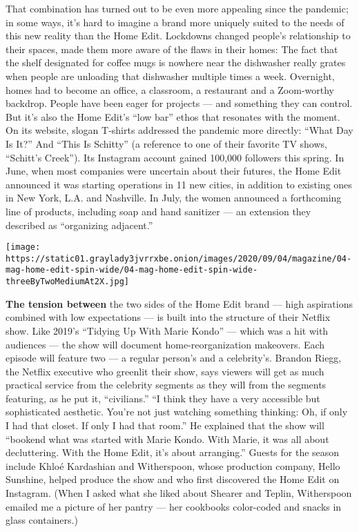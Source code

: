 That combination has turned out to be even more appealing since the
pandemic; in some ways, it's hard to imagine a brand more uniquely
suited to the needs of this new reality than the Home Edit. Lockdowns
changed people's relationship to their spaces, made them more aware of
the flaws in their homes: The fact that the shelf designated for coffee
mugs is nowhere near the dishwasher really grates when people are
unloading that dishwasher multiple times a week. Overnight, homes had to
become an office, a classroom, a restaurant and a Zoom-worthy backdrop.
People have been eager for projects --- and something they can control.
But it's also the Home Edit's ``low bar'' ethos that resonates with the
moment. On its website, slogan T-shirts addressed the pandemic more
directly: ``What Day Is It?'' And ``This Is Schitty'' (a reference to
one of their favorite TV shows, ``Schitt's Creek''). Its Instagram
account gained 100,000 followers this spring. In June, when most
companies were uncertain about their futures, the Home Edit announced it
was starting operations in 11 new cities, in addition to existing ones
in New York, L.A. and Nashville. In July, the women announced a
forthcoming line of products, including soap and hand sanitizer --- an
extension they described as ``organizing adjacent.''

\texttt{[image: https://static01.graylady3jvrrxbe.onion/images/2020/09/04/magazine/04-mag-home-edit-spin-wide/04-mag-home-edit-spin-wide-threeByTwoMediumAt2X.jpg]}

\textbf{The tension between} the two sides of the Home Edit brand ---
high aspirations combined with low expectations --- is built into the
structure of their Netflix show. Like 2019's ``Tidying Up With Marie
Kondo'' --- which was a hit with audiences --- the show will document
home-reorganization makeovers. Each episode will feature two --- a
regular person's and a celebrity's. Brandon Riegg, the Netflix executive
who greenlit their show, says viewers will get as much practical service
from the celebrity segments as they will from the segments featuring, as
he put it, ``civilians.'' ``I think they have a very accessible but
sophisticated aesthetic. You're not just watching something thinking:
Oh, if only I had that closet. If only I had that room.'' He explained
that the show will ``bookend what was started with Marie Kondo. With
Marie, it was all about decluttering. With the Home Edit, it's about
arranging.'' Guests for the season include Khloé Kardashian and
Witherspoon, whose production company, Hello Sunshine, helped produce
the show and who first discovered the Home Edit on Instagram. (When I
asked what she liked about Shearer and Teplin, Witherspoon emailed me a
picture of her pantry --- her cookbooks color-coded and snacks in glass
containers.)

